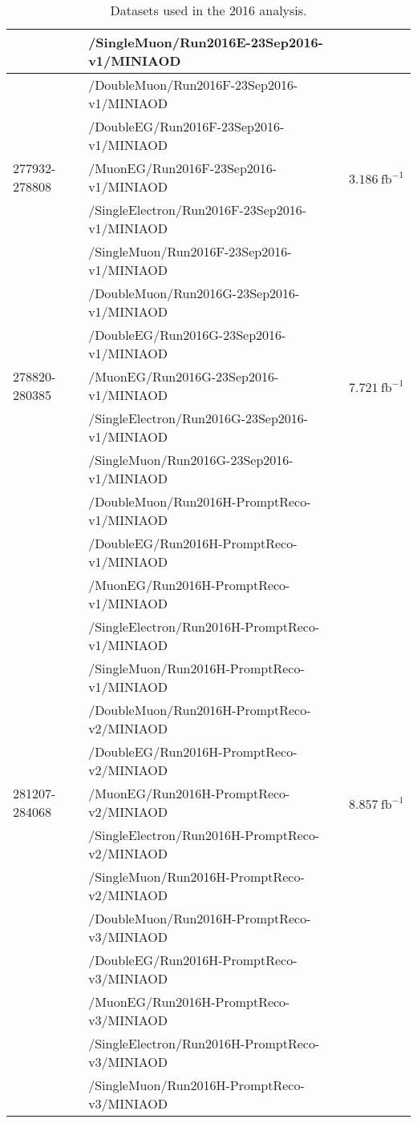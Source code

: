 \begin{table}[h]
\begin{tabular}{|l|l|l|}
& /SingleMuon/Run2016E-23Sep2016-v1/MINIAOD &  \\
\hline
\multirow{5}{*}{277932-278808} & /DoubleMuon/Run2016F-23Sep2016-v1/MINIAOD &  \multirow{5}{*}{$3.186\ \text{fb}^{-1}$} \\
& /DoubleEG/Run2016F-23Sep2016-v1/MINIAOD &  \\
& /MuonEG/Run2016F-23Sep2016-v1/MINIAOD &  \\
& /SingleElectron/Run2016F-23Sep2016-v1/MINIAOD &  \\
& /SingleMuon/Run2016F-23Sep2016-v1/MINIAOD &  \\
\hline
\multirow{5}{*}{278820-280385} & /DoubleMuon/Run2016G-23Sep2016-v1/MINIAOD &  \multirow{5}{*}{$7.721\ \text{fb}^{-1}$} \\
& /DoubleEG/Run2016G-23Sep2016-v1/MINIAOD &  \\
& /MuonEG/Run2016G-23Sep2016-v1/MINIAOD &  \\
& /SingleElectron/Run2016G-23Sep2016-v1/MINIAOD &  \\
& /SingleMuon/Run2016G-23Sep2016-v1/MINIAOD &  \\
\hline
\multirow{15}{*}{281207-284068} & /DoubleMuon/Run2016H-PromptReco-v1/MINIAOD &  \multirow{15}{*}{$8.857\ \text{fb}^{-1}$} \\
& /DoubleEG/Run2016H-PromptReco-v1/MINIAOD &  \\
& /MuonEG/Run2016H-PromptReco-v1/MINIAOD &  \\
& /SingleElectron/Run2016H-PromptReco-v1/MINIAOD &  \\
& /SingleMuon/Run2016H-PromptReco-v1/MINIAOD &  \\
& /DoubleMuon/Run2016H-PromptReco-v2/MINIAOD &  \\
& /DoubleEG/Run2016H-PromptReco-v2/MINIAOD &  \\
& /MuonEG/Run2016H-PromptReco-v2/MINIAOD &  \\
& /SingleElectron/Run2016H-PromptReco-v2/MINIAOD &  \\
& /SingleMuon/Run2016H-PromptReco-v2/MINIAOD &  \\
& /DoubleMuon/Run2016H-PromptReco-v3/MINIAOD &  \\
& /DoubleEG/Run2016H-PromptReco-v3/MINIAOD &  \\
& /MuonEG/Run2016H-PromptReco-v3/MINIAOD &  \\
& /SingleElectron/Run2016H-PromptReco-v3/MINIAOD &  \\
& /SingleMuon/Run2016H-PromptReco-v3/MINIAOD &  \\
\hline %
\hline %
     \end{tabular}
\small
    \caption{ Datasets used in the 2016 analysis. }
    \label{tab:datasets_data2016}
\end{table}



